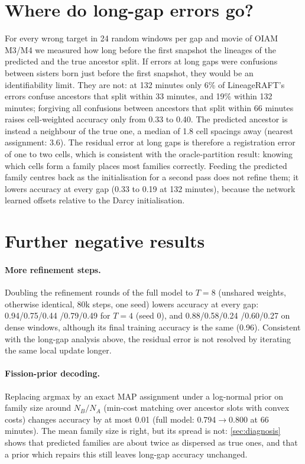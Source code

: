 \documentclass[10pt,twocolumn,letterpaper]{article}
\newcommand{\ours}{LineageRAFT\xspace}
\begin{document}
\section{Where do long-gap errors go?}
For every wrong target in 24 random windows per gap and movie of OIAM M3/M4 we measured how long before the first snapshot the lineages of the predicted and the true ancestor split.
If errors at long gaps were confusions between sisters born just before the first snapshot, they would be an identifiability limit.
They are not: at 132 minutes only 6\% of \ours's errors confuse ancestors that split within 33 minutes, and 19\% within 132 minutes; forgiving all confusions between ancestors that split within 66 minutes raises cell-weighted accuracy only from 0.33 to 0.40.
The predicted ancestor is instead a neighbour of the true one, a median of 1.8 cell spacings away (nearest assignment: 3.6).
The residual error at long gaps is therefore a registration error of one to two cells, which is consistent with the oracle-partition result: knowing which cells form a family places most families correctly.
Feeding the predicted family centres back as the initialisation for a second pass does not refine them; it lowers accuracy at every gap (0.33 to 0.19 at 132 minutes), because the network learned offsets relative to the Darcy initialisation.

\section{Further negative results}
\paragraph{More refinement steps.}
Doubling the refinement rounds of the full model to $T{=}8$ (unshared weights, otherwise identical, 80k steps, one seed) lowers accuracy at every gap: 0.94/0.75/0.44 /0.79/0.49 for $T{=}4$ (seed 0), and 0.88/0.58/0.24 /0.60/0.27 on dense windows, although its final training accuracy is the same (0.96).
Consistent with the long-gap analysis above, the residual error is not resolved by iterating the same local update longer.

\paragraph{Fission-prior decoding.}
Replacing argmax by an exact MAP assignment under a log-normal prior on family size around $N_B/N_A$ (min-cost matching over ancestor slots with convex costs) changes accuracy by at most 0.01 (full model: 0.794$\to$0.800 at 66 minutes). The mean family size is right, but its spread is not: \cref{sec:diagnosis} shows that predicted families are about twice as dispersed as true ones, and that a prior which repairs this still leaves long-gap accuracy unchanged.
\end{document}
